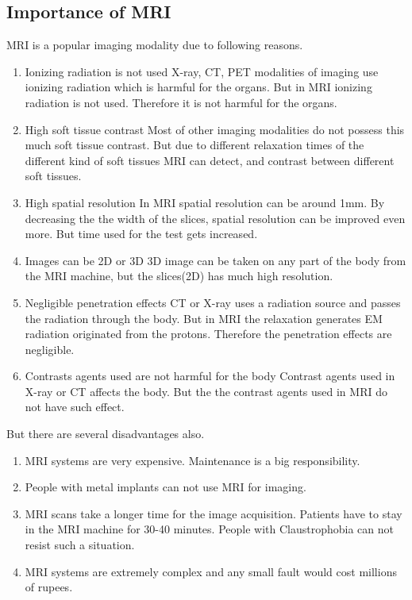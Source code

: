 \documentclass[12pt]{article}
\def \topic{MRI}
\begin{document}
\subsection{Importance of \topic}
MRI is a popular imaging modality due to following reasons.  
\begin{enumerate}
    \item Ionizing radiation is not used\newline
    X-ray, CT, PET modalities of imaging use ionizing radiation which is harmful for the organs. But in MRI ionizing radiation is not used. Therefore it is not harmful for the organs. 
    \item High soft tissue contrast \newline
    Most of other imaging modalities do not possess this much soft tissue contrast. But due to different relaxation times of the different kind of soft tissues MRI can detect, and contrast between different soft tissues.  
    
    \item High spatial resolution\newline
    In MRI spatial resolution can be around 1mm. By decreasing the the width of the slices, spatial resolution can be improved even more. But time used for the test gets increased. 
  
    \item Images can be 2D or 3D\newline
    3D image can be taken on any part of the body from the MRI machine, but the slices(2D) has much high resolution. 
    
    \item Negligible penetration effects\newline
    CT or X-ray uses a radiation source and passes the radiation through the body. But in MRI the relaxation generates EM radiation originated from the protons. Therefore the penetration effects are negligible. 
    
    \item Contrasts agents used are not harmful for the body\newline
    Contrast agents used in X-ray or CT affects the body. But the the contrast agents used in MRI do not have such effect.
\end{enumerate}
But there are several disadvantages also. 
\begin{enumerate}
    \item MRI systems are very expensive. Maintenance is a big responsibility.  
    \item People with metal implants can not use MRI for imaging.
    \item MRI scans take a longer time for the image acquisition. Patients have to stay in the MRI machine for 30-40 minutes. People with Claustrophobia can not resist such a situation. 
    \item MRI systems are extremely complex and any small fault would cost millions of rupees. 
\end{enumerate}
\end{document}
